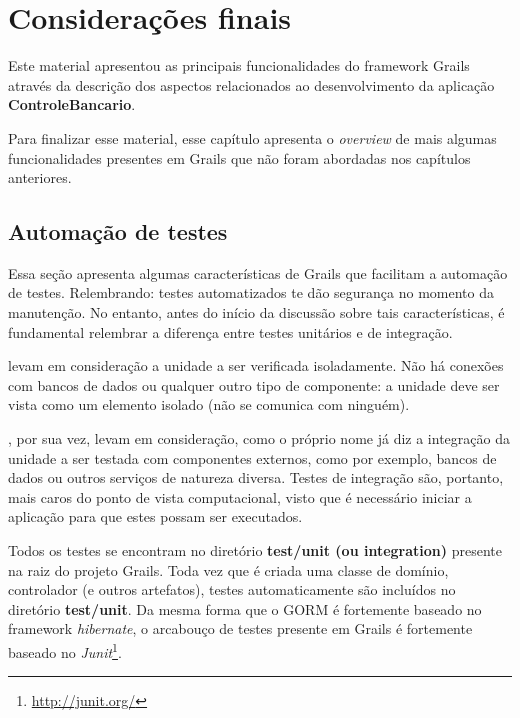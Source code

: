 \chapter{Considerações finais}\label{conclusoes}

Este  material  apresentou as  principais  funcionalidades  do framework  Grails
através da  descrição dos aspectos relacionados ao  desenvolvimento da aplicação
{\bf ControleBancario}.

\vspace{0.2cm}
\noindent Para finalizar esse material, esse capítulo apresenta o {\it overview}
de mais algumas funcionalidades presentes  em Grails que não foram abordadas nos
capítulos anteriores.

\section{Automação de testes}

\vspace{0.5cm}

Essa seção apresenta algumas características de Grails que facilitam a automação
de  testes. Relembrando:  testes automatizados  te dão  segurança no  momento da
manutenção. No entanto, antes do início da discussão sobre tais características,
é fundamental relembrar a diferença entre testes unitários e de integração. 

\vspace{0.5cm}
 levam em consideração a unidade a ser verificada
isoladamente. Não  há conexões  com bancos  de dados ou  qualquer outro  tipo de
componente: a unidade  deve ser vista como um elemento  isolado (não se comunica
com ninguém).

\vspace{0.5cm}
, por sua vez, levam em consideração, como o
próprio  nome já  diz a  integração  da unidade  a ser  testada com  componentes
externos,  como por  exemplo, bancos  de dados  ou outros  serviços  de natureza
diversa.  Testes de  integração  são, portanto,  mais  caros do  ponto de  vista
computacional, visto que é necessário  iniciar a aplicação para que estes possam
ser executados. 

Todos  os testes  se encontram  no  diretório {\bf  test/unit (ou  integration)}
presente na raiz do projeto Grails. Toda vez que é criada uma classe de domínio,
controlador  (e  outros  artefatos),  testes automaticamente  são  incluídos  no
diretório {\bf  test/unit}.  Da mesma forma  que o GORM é  fortemente baseado no
framework {\it hibernate}, o arcabouço de testes presente em Grails é fortemente
baseado no {\it Junit}\footnote{\url{http://junit.org/}}.  

